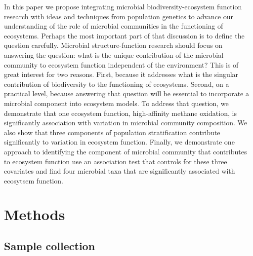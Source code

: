 \documentclass{article}
\begin{document}

In this paper we propose integrating microbial biodiversity-ecosystem function
research with ideas and techniques from population genetics to advance our
understanding of the role of microbial communities in the functioning of
ecosystems. Perhaps the most important part of that discussion is to define the
question carefully. Microbial structure-function research should focus on answering the question: what is the
unique contribution of the microbial community to ecosystem function independent
of the environment? This is of
great interest for two reasons. First, because it addresses what is the singular
contribution of biodiversity to the functioning of ecosystems. Second, on a
practical level, because answering that question will be essential to
incorporate a microbial component into ecosystem models. To address that
question, we demonstrate that one ecosystem function, high-affinity methane
oxidation, is significantly association with variation in microbial community
composition. We also show that three components of population stratification
contribute significantly to variation in ecosystem function. Finally, we
demonstrate one approach to identifying the component of microbial
community that contributes to ecosystem function use an association test that
controls for these three
covariates and find four microbial taxa that are significantly associated with
ecosytsem function.

\section{Methods}

\subsection{Sample collection}
\end{document}
